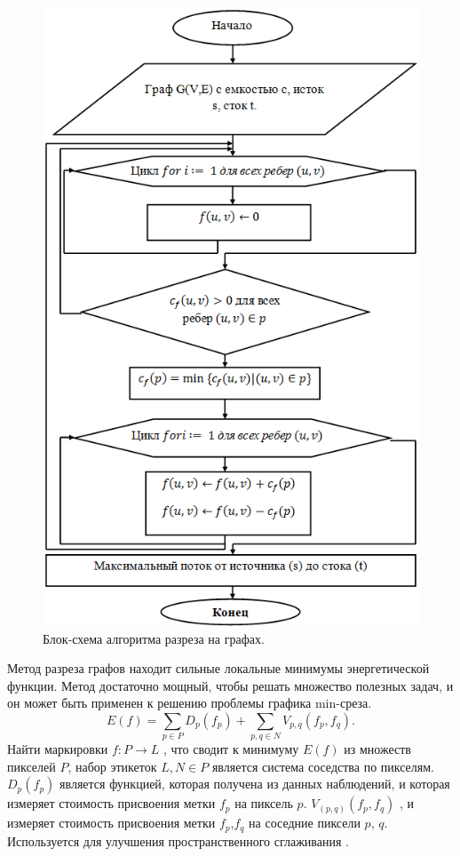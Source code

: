 \begin{figure}[ht!]
\centering
\includegraphics [scale=1] {images/h12.png}
\begin{center}
\caption{Блок-схема алгоритма разреза на графах.} \label{img12}
\end{center}
\end{figure}

Метод разреза графов находит сильные локальные минимумы энергетической функции. Метод достаточно мощный, чтобы решать множество полезных задач, и он может быть применен к решению проблемы графика min-среза. 
\begin{equation}\label{eq25}
E\left(f\right) = \sum_{p \in P}D_p\left(f_p\right)+\sum_{p,q \in N}V_{p,q}\left(f_p,f_q\right).
\end{equation}
Найти маркировки $f:P\rightarrow L$ , что сводит к минимуму $E\left(f\right)$ из множеств пикселей $P$, набор этикеток $L,N \in P$ является система соседства по пикселям. $D_p\left(f_p\right)$ является функцией, которая получена из данных наблюдений, и которая измеряет стоимость присвоения метки $f_p$ на пиксель $p$. $V_{\left(p,q\right)} \left(f_p,f_q\right)$ , и измеряет стоимость присвоения метки $f_p$,$f_q$ на соседние пиксели $p$, $q$. Используется для улучшения пространственного сглаживания \cite{Boykovv2001, Boykov2004}.

